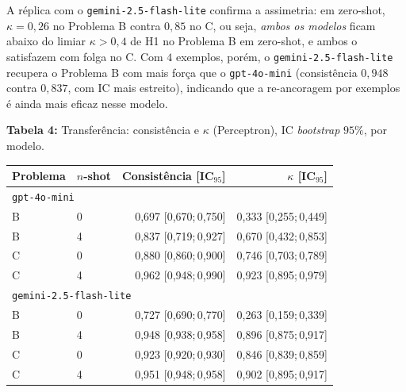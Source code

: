 \documentclass[12pt,a4paper]{article}
\begin{document}
A réplica com o \texttt{gemini-2.5-flash-lite} confirma a assimetria: em zero-shot,
$\kappa = 0{,}26$ no Problema B contra $0{,}85$ no C, ou seja, \emph{ambos os modelos}
ficam abaixo do limiar $\kappa > 0{,}4$ de H1 no Problema B em zero-shot, e ambos o
satisfazem com folga no C. Com $4$ exemplos, porém, o \texttt{gemini-2.5-flash-lite}
recupera o Problema B com mais força que o \texttt{gpt-4o-mini} (consistência $0{,}948$
contra $0{,}837$, com IC mais estreito), indicando que a re-ancoragem por exemplos é
ainda mais eficaz nesse modelo.


\bigskip

\noindent \textbf{Tabela 4:} Transferência: consistência e $\kappa$ (Perceptron), IC \emph{bootstrap} $95\%$,
por modelo.

\begin{tabular}{llrr}
\toprule
\textbf{Problema} & \textbf{$n$-shot} & \textbf{Consistência [IC$_{95}$]} &
\textbf{$\kappa$ [IC$_{95}$]} \\
\midrule
\multicolumn{4}{l}{\texttt{gpt-4o-mini}} \\
\midrule
B & 0 & 0,697 [0,670;\,0,750] & 0,333 [0,255;\,0,449] \\
B & 4 & 0,837 [0,719;\,0,927] & 0,670 [0,432;\,0,853] \\
C & 0 & 0,880 [0,860;\,0,900] & 0,746 [0,703;\,0,789] \\
C & 4 & 0,962 [0,948;\,0,990] & 0,923 [0,895;\,0,979] \\
\midrule
\multicolumn{4}{l}{\texttt{gemini-2.5-flash-lite}} \\
\midrule
B & 0 & 0,727 [0,690;\,0,770] & 0,263 [0,159;\,0,339] \\
B & 4 & 0,948 [0,938;\,0,958] & 0,896 [0,875;\,0,917] \\
C & 0 & 0,923 [0,920;\,0,930] & 0,846 [0,839;\,0,859] \\
C & 4 & 0,951 [0,948;\,0,958] & 0,902 [0,895;\,0,917] \\
\bottomrule
\end{tabular}

\bigskip
\end{document}

